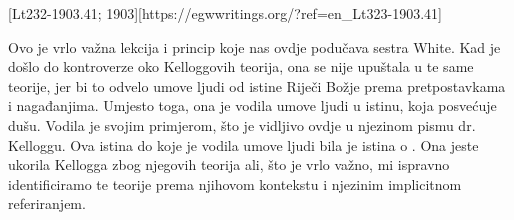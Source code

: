 [Lt232-1903.41; 1903][https://egwwritings.org/?ref=en\_Lt323-1903.41]

Ovo je vrlo važna lekcija i princip koje nas ovdje podučava sestra White. Kad je došlo do kontroverze oko Kelloggovih teorija, ona se nije upuštala u te same teorije, jer bi to odvelo umove ljudi od istine Riječi Božje prema pretpostavkama i nagađanjima. Umjesto toga, ona je vodila umove ljudi u istinu, koja posvećuje dušu. Vodila je svojim primjerom, što je vidljivo ovdje u njezinom pismu dr. Kelloggu. Ova istina do koje je vodila umove ljudi bila je istina o . Ona jeste ukorila Kellogga zbog njegovih teorija ali, što je vrlo važno, mi ispravno identificiramo te teorije prema njihovom kontekstu i njezinim implicitnom referiranjem.


